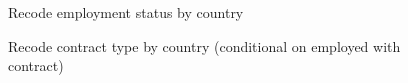 \begin{figure}
    \caption{Recode employment status by country}
    \label{graph_descriptives_emp_status}
\end{figure}

\begin{figure}
    \caption{Recode contract type by country (conditional on employed with contract)}
    \label{graph_descriptives_contyp}
\end{figure}

